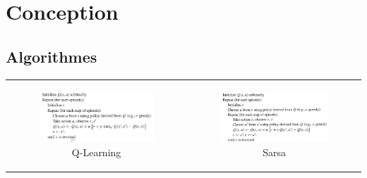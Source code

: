 \documentclass[a4paper,12pt]{article}
\begin{document}
  
  \section{Conception}
  
  \subsection{Algorithmes}
  
  
        \begin{center}
	\begin{tabular}{cc}
	  \hspace*{-1cm}
	  \begin{minipage}[b]{.52\linewidth}
	    \begin{figure}[H]
	      \includegraphics[width=270px]{QLearning}
	      \caption{ Q-Learning  }
	    \end{figure}
	  \end{minipage}
	  &
	  \begin{minipage}[b]{.5\linewidth}
	    \begin{figure}[H]
	      \includegraphics[width=270px]{Sarsa}
	      \caption{ Sarsa  }
	    \end{figure}
	  \end{minipage}
	\end{tabular}
      \end{center} 
      
  
  
\end{document}
